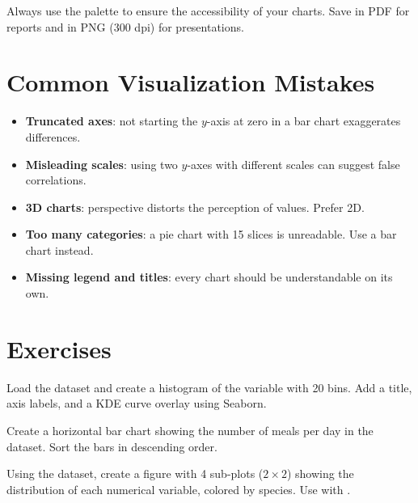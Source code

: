 \begin{bestpractice}
Always use the  palette to ensure the accessibility of your charts. Save in PDF for reports and in PNG (300 dpi) for presentations.
\end{bestpractice}

\section{Common Visualization Mistakes}

\begin{warning}
\begin{itemize}
    \item \textbf{Truncated axes}: not starting the $y$-axis at zero in a bar chart exaggerates differences.
    \item \textbf{Misleading scales}: using two $y$-axes with different scales can suggest false correlations.
    \item \textbf{3D charts}: perspective distorts the perception of values. Prefer 2D.
    \item \textbf{Too many categories}: a pie chart with 15 slices is unreadable. Use a bar chart instead.
    \item \textbf{Missing legend and titles}: every chart should be understandable on its own.
\end{itemize}
\end{warning}

\section{Exercises}

\begin{exercise}[$\star$]
Load the  dataset and create a histogram of the  variable with 20 bins. Add a title, axis labels, and a KDE curve overlay using Seaborn.
\end{exercise}

\begin{exercise}[$\star$]
Create a horizontal bar chart showing the number of meals per day in the  dataset. Sort the bars in descending order.
\end{exercise}

\begin{exercise}[$\star\star$]
Using the  dataset, create a figure with 4 sub-plots ($2 \times 2$) showing the distribution of each numerical variable, colored by species. Use  with .
\end{exercise}

